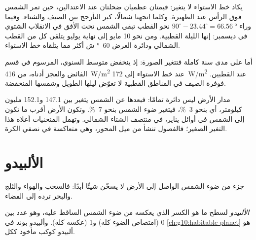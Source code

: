 \begin{remark}\label{rem:g10:earth-energy-budget:curves}
يكاد  خط الاستواء لا يتغير: قيمتان عظميان ضحلتان عند الاعتدالين، حين تمر
الشمس فوق الرأس عند الظهيرة. وكلما اتجهنا شمالًا، كبر التأرجح بين الصيف والشتاء.
وفيما وراء $90^\circ - 23.44^\circ = \qty{66.56}{\degree}$ نحو القطب تبقى الشمس
تحت الأفق في الانقلاب الشتوي في ديسمبر: إنها الليلة القطبية. ومن نحو 10 مايو إلى
نهاية يوليو يتلقى كل من القطب الشمالي ودائرة العرض \qty{60}{\degree} ش أكثر مما
يتلقاه خط الاستواء.
\end{remark}

أما على مدى سنة كاملة فتتغير الصورة: إذ ينخفض متوسط  السنوي، المرسوم في
قسم الفائض والعجز أدناه، من \qty{416}{W/m^2} عند خط الاستواء إلى \qty{172}{W/m^2}
عند القطبين. فوفرة الصيف في المناطق القطبية لا تعوّض ليلها الطويل وشمسها
المنخفضة.

\begin{remark}\label{rem:g10:earth-energy-budget:distance}
مدار الأرض ليس دائرة تمامًا: فبعدها عن الشمس يتغير بين \num{147.1} و\num{152.1}
مليون كيلومتر، أي بنحو \qty{3}{\percent}، فيتغير ضوء الشمس بنحو
\qty{7}{\percent}. وتكون الأرض أقرب ما تكون إلى الشمس في أوائل يناير، في منتصف
الشتاء الشمالي. وتهمل المنحنيات أعلاه هذا التغير الصغير؛ فالفصول تنشأ من ميل
المحور، وهي متعاكسة في نصفي الكرة.
\end{remark}

\section{الألبيدو}

جزء من ضوء الشمس الواصل إلى الأرض لا يسخّن شيئًا أبدًا: فالسحب والهواء والثلج
والبحر ترده إلى الفضاء.

\begin{definition}[الألبيدو]\label{def:g10:earth-energy-budget:albedo}
\emph{الألبيدو} لسطح ما هو الكسر الذي يعكسه من ضوء الشمس الساقط
عليه، وهو عدد بين 0 (امتصاص الضوء كله) و1 (عكسه كله). وألبيدو بوند في
\cref{ch:g10:habitable-planet} هو ألبيدو كوكب مأخوذ ككل.
\end{definition}

